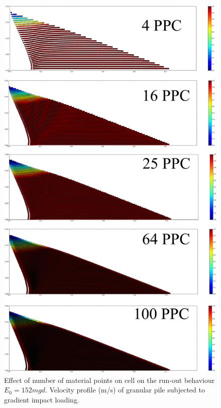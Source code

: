 \begin{figure}[tbhp]
\centering
\includegraphics[height=\textheight]{MPM_500ppc}
\caption{Effect of number of material points on cell on the run-out behaviour 
$E_0=152mgd$. 
Velocity profile (\si{\m/\s}) of granular pile subjected to gradient impact 
loading.}
\label{fig:MPM_500ppc}
\end{figure}

